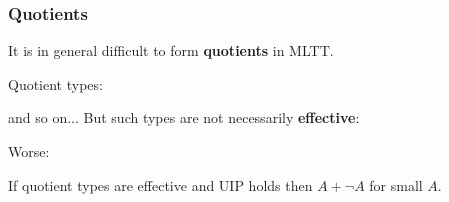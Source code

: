 \documentclass[handout]{beamer} %
\begin{document}
\begin{frame}
  \frametitle{Quotients}

  It is in general difficult to form \textbf{quotients} in MLTT.
  
  \medskip
  
  Quotient types:
  and so on... But such types are not necessarily \textbf{effective}:
  \begin{mathpar}
    \small
  \end{mathpar}
  Worse:
  \begin{theorem}[Maietti 1999]
    If quotient types are effective and UIP holds then $A + \lnot A$ for small $A$.
  \end{theorem}
  
\end{frame}
\end{document}
